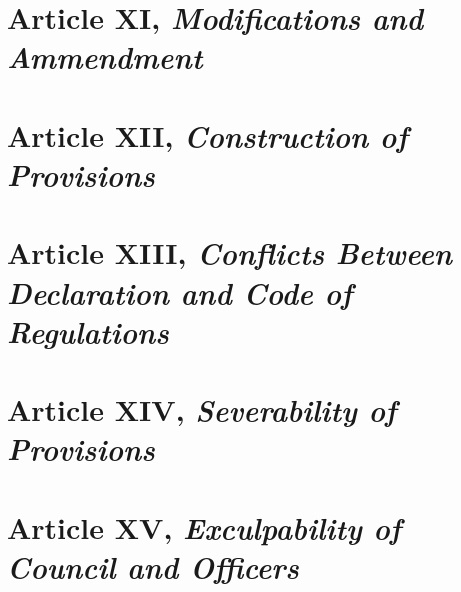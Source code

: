 \documentclass[
]{book}
\begin{document}
\hypertarget{article-xi-modifications-and-ammendment}{%
\section*{\texorpdfstring{Article XI, \emph{Modifications and Ammendment}}{Article XI, Modifications and Ammendment}}\label{article-xi-modifications-and-ammendment}}

\hypertarget{article-xii-construction-of-provisions}{%
\section*{\texorpdfstring{Article XII, \emph{Construction of Provisions}}{Article XII, Construction of Provisions}}\label{article-xii-construction-of-provisions}}

\hypertarget{article-xiii-conflicts-between-declaration-and-code-of-regulations}{%
\section*{\texorpdfstring{Article XIII, \emph{Conflicts Between Declaration and Code of Regulations}}{Article XIII, Conflicts Between Declaration and Code of Regulations}}\label{article-xiii-conflicts-between-declaration-and-code-of-regulations}}

\hypertarget{article-xiv-severability-of-provisions}{%
\section*{\texorpdfstring{Article XIV, \emph{Severability of Provisions}}{Article XIV, Severability of Provisions}}\label{article-xiv-severability-of-provisions}}

\hypertarget{article-xv-exculpability-of-council-and-officers}{%
\section*{\texorpdfstring{Article XV, \emph{Exculpability of Council and Officers}}{Article XV, Exculpability of Council and Officers}}\label{article-xv-exculpability-of-council-and-officers}}
\end{document}
